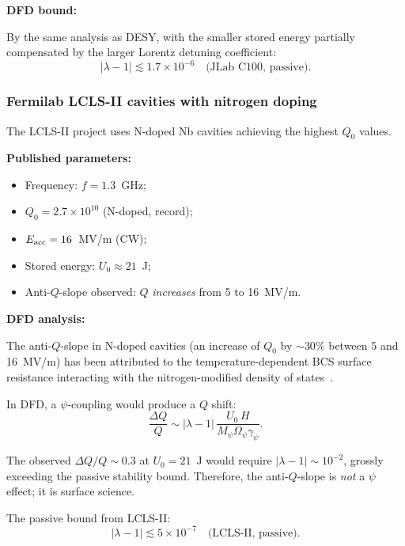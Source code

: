 \documentclass[12pt,aps,prd,twocolumn,superscriptaddress,nofootinbib]{revtex4-2}
\newcommand{\Opsi}{\Omega_\psi}
\newcommand{\gpsi}{\gamma_\psi}
\newcommand{\Mpsi}{M_\psi}
\begin{document}
\textbf{DFD bound:}

By the same analysis as DESY, with the smaller stored energy
partially compensated by the larger Lorentz detuning coefficient:
\begin{equation}
|\lambda-1| \lesssim 1.7\times10^{-6}
\quad\text{(JLab C100, passive)}.
\label{eq:jlab_result}
\end{equation}

\subsubsection{Fermilab LCLS-II cavities with nitrogen doping}
\label{sec:fnal}

The LCLS-II project uses N-doped Nb cavities achieving the highest
$Q_0$ values.

\textbf{Published parameters:}
\begin{itemize}[noitemsep]
\item Frequency: $f = 1.3$~GHz;
\item $Q_0 = 2.7\times10^{10}$ (N-doped, record);
\item $E_{\rm acc} = 16$~MV/m (CW);
\item Stored energy: $U_0 \approx 21$~J;
\item Anti-$Q$-slope observed: $Q$ \emph{increases} from 5 to 16~MV/m.
\end{itemize}

\textbf{DFD analysis:}

The anti-$Q$-slope in N-doped cavities (an increase of $Q_0$ by
$\sim30\%$ between 5 and 16~MV/m) has been attributed to the
temperature-dependent BCS surface resistance interacting with the
nitrogen-modified density of states~\cite{Grassellino2013}.

In DFD, a $\psi$-coupling would produce a $Q$ shift:
\begin{equation}
\frac{\Delta Q}{Q} \sim |\lambda-1|\,\frac{U_0\,H}{\Mpsi\Opsi\gpsi}.
\label{eq:Q_shift}
\end{equation}

The observed $\Delta Q/Q \sim 0.3$ at $U_0 = 21$~J would require
$|\lambda-1| \sim 10^{-2}$, grossly exceeding the passive stability
bound.  Therefore, the anti-$Q$-slope is \emph{not} a $\psi$ effect;
it is surface science.

The passive bound from LCLS-II:
\begin{equation}
|\lambda-1| \lesssim 5\times10^{-7}
\quad\text{(LCLS-II, passive)}.
\label{eq:lcls_result}
\end{equation}
\end{document}
